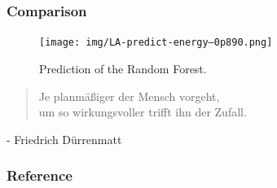 \documentclass{beamer}
\begin{document}
\begin{frame}[fragile]
\frametitle{Comparison}
\framesubtitle{}

\begin{figure}[H]
  \center
  \texttt{[image: img/LA-predict-energy--0p890.png]}
  \caption{Prediction of the Random Forest.}
\end{figure}

\hbox{}
\hbox{}

\begin{quote}
\hfill Je planmäßiger der Mensch vorgeht,\\
\hfill um so wirkungsvoller trifft ihn der Zufall.\\
\end{quote}
\hfill \small{- Friedrich Dürrenmatt}

\end{frame}


\begin{frame}
\frametitle{Reference}



\end{frame}








%





\end{document}
